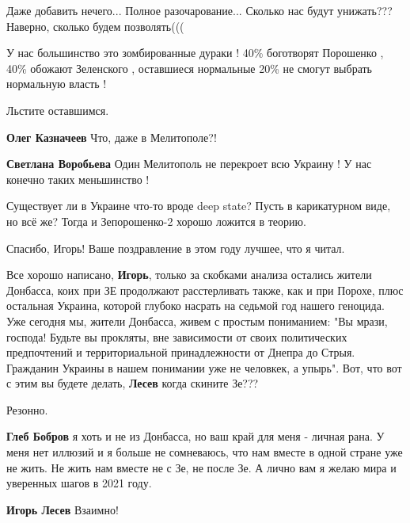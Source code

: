\begin{itemize}
\begin{itemize}
\end{itemize} %


Даже добавить нечего... Полное разочарование... Сколько нас будут унижать???
Наверно, сколько будем позволять(((


У нас большинство это зомбированные дураки ! 40\% боготворят Порошенко , 40\%
обожают Зеленского , оставшиеся нормальные 20\% не смогут выбрать нормальную
власть !

\begin{itemize} %
Льстите оставшимся.

\textbf{Олег Казначеев} Что, даже в Мелитополе?!

\textbf{Светлана Воробьева} Один Мелитополь не перекроет всю Украину ! У нас конечно таких меньшинство !
\end{itemize} %

Существует ли в Украине что-то вроде deep state? Пусть в карикатурном виде, но всё же? Тогда и Зепорошенко-2 хорошо ложится в теорию.

Спасибо, Игорь! Ваше поздравление в этом году лучшее, что я читал.


Все хорошо написано, \textbf{Игорь}, только за скобками анализа остались жители
Донбасса, коих при ЗЕ продолжают расстерливать также, как и при Порохе, плюс
остальная Украина, которой глубоко насрать на седьмой год нашего геноцида. Уже
сегодня мы, жители Донбасса, живем с простым пониманием: "Вы мрази, господа!
Будьте вы прокляты, вне зависимости от своих политических предпочтений и
территориальной принадлежности от Днепра до Стрыя. Гражданин Украины в нашем
понимании уже не человкек, а упырь". Вот, что вот с этим вы будете делать,
\textbf{Лесев} когда скините Зе???

\begin{itemize} %
Резонно.

\textbf{Глеб Бобров} я хоть и не из Донбасса, но ваш край для меня - личная рана. У меня нет иллюзий и я больше не сомневаюсь, что нам вместе в одной стране уже не жить. Не жить нам вместе не с Зе, не после Зе. А лично вам я желаю мира и уверенных шагов в 2021 году.

\textbf{Игорь Лесев} Взаимно!


\end{itemize}
\end{itemize}
